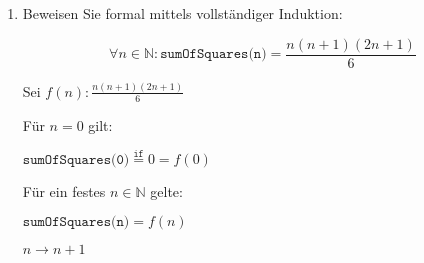 \documentclass{lehramt-informatik-aufgabe}
\begin{document}
\begin{enumerate}


\item Beweisen Sie formal mittels vollständiger Induktion:

\begin{displaymath}
\forall n \in \mathbb{N} : \texttt{sumOfSquares(n)} =
\frac{n(n + 1)(2n + 1)}{6}
\end{displaymath}

\begin{liAntwort}
Sei $f(n): \frac{n(n + 1)(2n + 1)}{6}$

%

\liInduktionAnfang

Für $n = 0$ gilt:

$\texttt{sumOfSquares(0)} \overset{\texttt{if}}{=} 0 = f(0)$

%

\liInduktionVoraussetzung

Für ein festes $n \in \mathbb{N}$ gelte:

$\texttt{sumOfSquares(n)} = f(n)$

%

\liInduktionSchritt

$n \rightarrow n + 1$


\end{liAntwort}
\end{enumerate}
\end{document}
